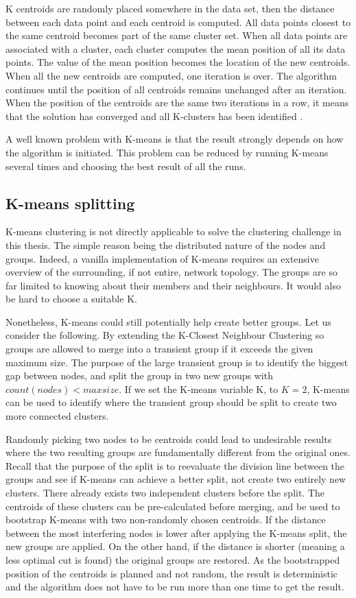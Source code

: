 K centroids are randomly placed somewhere in the data set, then the distance between each data point and each centroid is computed. All data points
closest to the same centroid becomes part of the same cluster set. When all data points are associated with a cluster, each cluster computes the mean position of all its data points.
The value of the mean position becomes the location of the new centroids. When all the new centroids are computed, one iteration is over. The algorithm continues until the position 
of all centroids remains unchanged after an iteration. When the position of the centroids are the same two iterations in a row, it means that the solution has converged and all K-clusters has been identified \cite{mackaymeans}.

A well known problem with K-means is that the result strongly depends on how the algorithm is initiated. This problem can be reduced by running K-means several times
and choosing the best result of all the runs. 

\subsection{K-means splitting}
K-means clustering is not directly applicable to solve the clustering challenge in this thesis. The simple reason being the distributed nature of
the nodes and groups. Indeed, a vanilla implementation of K-means requires an extensive overview of the surrounding, if not entire, network topology.
The groups are so far limited to knowing about their members and their neighbours. It would also be hard to choose a suitable K. 

Nonetheless, K-means could still potentially help create better groups. Let us consider the following.
By extending the K-Closest Neighbour Clustering so groups are allowed to merge into a transient group if it exceeds the given maximum size.
The purpose of the large transient group is to identify the biggest gap between nodes, and split the group in two new groups with
$count(nodes) < maxsize$. If we set the K-means variable K, to $K=2$, K-means can be used to identify where the transient group should be split to create two more connected clusters. 

Randomly picking two nodes to be centroids could lead to undesirable results where the two resulting groups are fundamentally different from the original ones.
Recall that the purpose of the split is to reevaluate the division line between the groups and see if K-means can achieve a better split, not create two entirely new clusters.
There already exists two independent clusters before the split. The centroids of these clusters can be pre-calculated before merging, and be used to bootstrap K-means with two non-randomly chosen
centroids.
If the distance between the most interfering nodes is lower after applying the K-means split, the new groups are applied. On the other hand, if the distance is shorter
(meaning a less optimal cut is found) the original groups are restored. As the bootstrapped position of the centroids is planned and not random,
the result is deterministic and the algorithm does not have to be run more than one time to get the result. 


